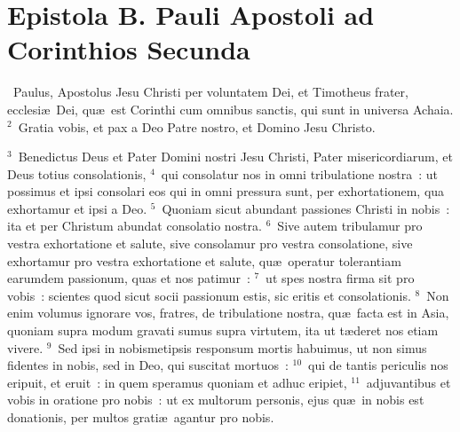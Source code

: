 \clearpage
{\centering \section*{Epistola B. Pauli Apostoli ad Corinthios Secunda}}\thispagestyle{empty}

~Paulus, Apostolus Jesu Christi per voluntatem Dei, et Timotheus frater, ecclesi\ae\ Dei, qu\ae\ est Corinthi cum omnibus sanctis, qui sunt in universa Achaia.
${}^{2}$~Gratia vobis, et pax a Deo Patre nostro, et Domino Jesu Christo.


${}^{3}$~Benedictus Deus et Pater Domini nostri Jesu Christi, Pater misericordiarum, et Deus totius consolationis,
${}^{4}$~qui consolatur nos in omni tribulatione nostra~: ut possimus et ipsi consolari eos qui in omni pressura sunt, per exhortationem, qua exhortamur et ipsi a Deo.
${}^{5}$~Quoniam sicut abundant passiones Christi in nobis~: ita et per Christum abundat consolatio nostra.
${}^{6}$~Sive autem tribulamur pro vestra exhortatione et salute, sive consolamur pro vestra consolatione, sive exhortamur pro vestra exhortatione et salute, qu\ae\ operatur tolerantiam earumdem passionum, quas et nos patimur~:
${}^{7}$~ut spes nostra firma sit pro vobis~: scientes quod sicut socii passionum estis, sic eritis et consolationis.
${}^{8}$~Non enim volumus ignorare vos, fratres, de tribulatione nostra, qu\ae\ facta est in Asia, quoniam supra modum gravati sumus supra virtutem, ita ut t\ae deret nos etiam vivere.
${}^{9}$~Sed ipsi in nobismetipsis responsum mortis habuimus, ut non simus fidentes in nobis, sed in Deo, qui suscitat mortuos~:
${}^{10}$~qui de tantis periculis nos eripuit, et eruit~: in quem speramus quoniam et adhuc eripiet,
${}^{11}$~adjuvantibus et vobis in oratione pro nobis~: ut ex multorum personis, ejus qu\ae\ in nobis est donationis, per multos grati\ae\ agantur pro nobis.


